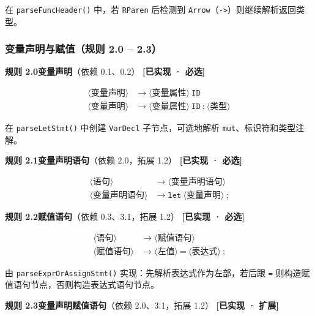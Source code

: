 \documentclass[12pt,a4paper]{ctexart}
\begin{document}
在 \texttt{parseFuncHeader()} 中，若 \texttt{RParen} 后检测到 \texttt{Arrow}（\texttt{->}）则继续解析返回类型。

\subsubsection{变量声明与赋值（规则 2.0 -- 2.3）}

\textbf{规则 2.0\quad 变量声明}（依赖 0.1、0.2） \hfill \textcolor{green!60!black}{\textbf{[已实现 · 必选]}}

\begin{align}
\langle\text{变量声明}\rangle &\rightarrow \langle\text{变量属性}\rangle \ \texttt{ID} \\
\langle\text{变量声明}\rangle &\rightarrow \langle\text{变量属性}\rangle \ \texttt{ID} \ \texttt{:} \ \langle\text{类型}\rangle
\end{align}

在 \texttt{parseLetStmt()} 中创建 \texttt{VarDecl} 子节点，可选地解析 \texttt{mut}、标识符和类型注解。

\textbf{规则 2.1\quad 变量声明语句}（依赖 2.0，拓展 1.2） \hfill \textcolor{green!60!black}{\textbf{[已实现 · 必选]}}

\begin{align}
\langle\text{语句}\rangle &\rightarrow \langle\text{变量声明语句}\rangle \\
\langle\text{变量声明语句}\rangle &\rightarrow \texttt{let} \ \langle\text{变量声明}\rangle \ \texttt{;}
\end{align}

\textbf{规则 2.2\quad 赋值语句}（依赖 0.3、3.1，拓展 1.2） \hfill \textcolor{green!60!black}{\textbf{[已实现 · 必选]}}

\begin{align}
\langle\text{语句}\rangle &\rightarrow \langle\text{赋值语句}\rangle \\
\langle\text{赋值语句}\rangle &\rightarrow \langle\text{左值}\rangle \ \texttt{=} \ \langle\text{表达式}\rangle \ \texttt{;}
\end{align}

由 \texttt{parseExprOrAssignStmt()} 实现：先解析表达式作为左部，若后跟 \texttt{=} 则构造赋值语句节点，否则构造表达式语句节点。

\textbf{规则 2.3\quad 变量声明赋值语句}（依赖 2.0、3.1，拓展 1.2） \hfill \textcolor{green!60!black}{\textbf{[已实现 · 扩展]}}
\end{document}
